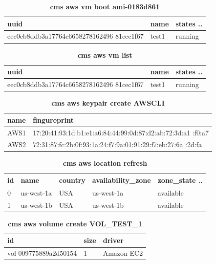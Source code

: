 \documentclass[9pt,twocolumn,twoside]{../../styles/osajnl}
\begin{document}
	\begin{table}[h!]
	\caption{\bf cms aws vm boot ami-0183d861 }
	\begin{tabular}{ | m{5.2cm} | m{1.1cm} | m{1.2cm} |} 
		\hline
		uuid & name & states ..\\
		\hline
		eec0cb8ddb3a17764c6658278162496 81cec1f67 & test1 & running \\
		
		\hline
	\end{tabular}
	\label{tab:vmboot}
\end{table}

\begin{table}[h!]
	\caption{\bf cms aws vm list }
	\begin{tabular}{ | m{5.1cm} | m{1.2cm} | m{1.2cm} |} 
		\hline
		uuid & name & states ..\\
		\hline
		eec0cb8ddb3a17764c6658278162496 81cec1f67 & test1 & running \\
		
		\hline
	\end{tabular}
	\label{tab:vmlist}
\end{table}


\begin{table}[h!]
	\caption{\bf cms aws keypair create AWSCLI }
	\begin{tabular}{ | m{0.8cm} | m{7.3cm} |} 
		\hline
		name & fingureprint\\
		\hline
		AWS1 & 17:20:41:93:1d:b1:e1:a6:84:44:99:0d:87:d2:ab:72:3d:a1 :f0:a7 \\
		AWS2 & 72:31:87:fc:2b:0f:93:1a:24:f7:9a:01:91:29:f7:eb:27:6a :2d:fa \\
		\hline
	\end{tabular}
	\label{tab:keypaircreate}
\end{table}

	\begin{table}[h!]
	\caption{\bf cms aws location refresh }
	\begin{tabular}{ | m{0.7em} | m{1.7cm}| m{1cm} | m{2.2cm} |m{1.7cm} |} 
		\hline
		id & name & country & availability\_zone & zone\_state ..\\
		\hline
		0 & us-west-1a & USA & us-west-1a & available \\
		1 & us-west-1b & USA & us-west-1b & available \\
		\hline
	\end{tabular}
	\label{tab:locationlist}
\end{table}

\begin{table}[h!]
	\caption{\bf cms aws volume create VOL\_TEST\_1 }
	\begin{tabular}{ | m{3.8cm} | m{1.8cm} | m{2cm} |}
		\hline
		id & size & driver \\
		\hline
		vol-009775889a2d50154 & 1 & Amazon EC2\\
		\hline
	\end{tabular}
	\label{tab:createvolume}
\end{table}
\end{document}
